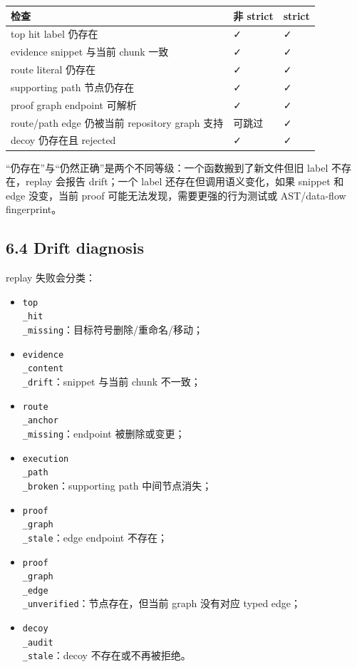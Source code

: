 \documentclass[UTF8,12pt,openany]{ctexbook}
\begin{document}
\begin{center}
\small
\begin{longtable}{|p{}|p{}|p{}|}
\toprule
检查 & 非 strict & strict \\
\midrule
top hit label 仍存在 & ✓ & ✓ \\
evidence snippet 与当前 chunk 一致 & ✓ & ✓ \\
route literal 仍存在 & ✓ & ✓ \\
supporting path 节点仍存在 & ✓ & ✓ \\
proof graph endpoint 可解析 & ✓ & ✓ \\
route/path edge 仍被当前 repository graph 支持 & 可跳过 & ✓ \\
decoy 仍存在且 rejected & ✓ & ✓ \\
\bottomrule
\end{longtable}
\end{center}

“仍存在”与“仍然正确”是两个不同等级：一个函数搬到了新文件但旧 label 不存在，replay 会报告 drift；一个 label 还存在但调用语义变化，如果 snippet 和 edge 没变，当前 proof 可能无法发现，需要更强的行为测试或 AST/data-flow fingerprint。\par

\subsection{6.4 Drift diagnosis}

replay 失败会分类：\par

\begin{itemize}
\item \texttt{top\\_hit\\_missing}：目标符号删除/重命名/移动；
\item \texttt{evidence\\_content\\_drift}：snippet 与当前 chunk 不一致；
\item \texttt{route\\_anchor\\_missing}：endpoint 被删除或变更；
\item \texttt{execution\\_path\\_broken}：supporting path 中间节点消失；
\item \texttt{proof\\_graph\\_stale}：edge endpoint 不存在；
\item \texttt{proof\\_graph\\_edge\\_unverified}：节点存在，但当前 graph 没有对应 typed edge；
\item \texttt{decoy\\_audit\\_stale}：decoy 不存在或不再被拒绝。
\end{itemize}
\end{document}
